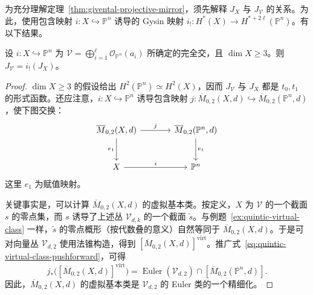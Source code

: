 为充分理解定理~\ref{thm:givental-projective-mirror}，须先解释 $J_X$ 与 $J_{\mathcal V}$ 的关系。为此，使用包含映射 $i:X\hookrightarrow\mathbb P^n$ 诱导的 Gysin 映射 $i_!:H^*(X)\to H^{*+2\ell}(\mathbb P^n)$。有以下结果。
\begin{proposition}\label{prop:complete-intersection-j-pushforward}
设 $i:X\hookrightarrow\mathbb P^n$ 为 $\mathcal V=\bigoplus_{i=1}^{\ell}\mathcal O_{\mathbb P^n}(a_i)$ 所确定的完全交，且 $\dim X\ge3$。则 $J_{\mathcal V}=i_!(J_X)$。
\end{proposition}
\begin{proof}
$\dim X\ge3$ 的假设给出 $H^2(\mathbb P^n)\simeq H^2(X)$，因而 $J_{\mathcal V}$ 与 $J_X$ 都是 $t_0,t_1$ 的形式函数。还应注意，$i:X\hookrightarrow\mathbb P^n$ 诱导包含映射 $j:\overline M_{0,2}(X,d)\hookrightarrow\overline M_{0,2}(\mathbb P^n,d)$，使下图交换：
\[
\begin{tikzcd}[column sep=large,row sep=large]
\overline M_{0,2}(X,d)\arrow[r,"j"]\arrow[d,"e_1"']&\overline M_{0,2}(\mathbb P^n,d)\arrow[d,"e_1"]\\
X\arrow[r,"i"]&\mathbb P^n
\end{tikzcd}
\]
这里 $e_1$ 为赋值映射。

关键事实是，可以计算 $\overline M_{0,2}(X,d)$ 的虚拟基本类。按定义，$X$ 为 $\mathcal V$ 的一个截面 $s$ 的零点集，而 $s$ 诱导了上述丛 $\mathcal V_{d,k}$ 的一个截面 $\widetilde s$。与例题~\ref{ex:quintic-virtual-class} 一样，$\widetilde s$ 的零点概形（按代数叠的意义）自然等同于 $\overline M_{0,2}(X,d)$。于是可对向量丛 $\mathcal V_{d,2}$ 使用法锥构造，得到 $[\overline M_{0,2}(X,d)]^{\mathrm{virt}}$。推广式~\eqref{eq:quintic-virtual-class-pushforward}，可得
\begin{equation}\label{eq:complete-intersection-virtual-pushforward}
j_*\bigl([\overline M_{0,2}(X,d)]^{\mathrm{virt}}\bigr)
=\operatorname{Euler}(\mathcal V_{d,2})\cap[\overline M_{0,2}(\mathbb P^n,d)].
\end{equation}
因此，$\overline M_{0,2}(X,d)$ 的虚拟基本类是 $\mathcal V_{d,2}$ 的 Euler 类的一个精细化。


\end{proof}
